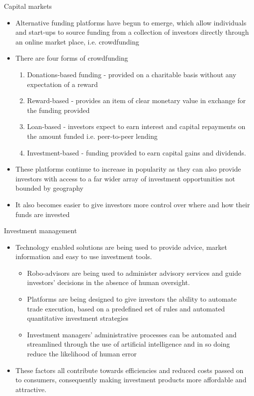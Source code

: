 \documentclass[9pt]{beamer}
\begin{document}
\begin{frame}{Capital markets}
	\begin{itemize}
		\item  Alternative funding platforms have begun to emerge, which allow individuals and start-ups to source funding from a collection of investors directly through an online market place, i.e. crowdfunding
		\item There are four forms of crowdfunding
		\begin{small}
			\begin{enumerate}
				\item Donations-based funding - provided on a charitable basis without any expectation of a reward
				\item Reward-based - provides an item of clear monetary value in exchange for the funding provided
				\item Loan-based - investors expect to earn interest and capital repayments on the amount funded i.e. peer-to-peer lending
				\item Investment-based - funding provided to earn capital gains and dividends.
			\end{enumerate}
		\end{small}
		\item These platforms continue to increase in popularity as they can also provide investors with access to a far wider array of investment opportunities not bounded by geography
		\item It also becomes easier to give investors more control over where and how their funds are invested
	\end{itemize}
\end{frame}


\begin{frame}{Investment management}
	\begin{itemize}
		\item Technology enabled solutions are being used to provide advice, market information and easy to use investment tools.
		\begin{itemize}
			\item Robo-advisors are being used to administer advisory services and guide investors' decisions in the absence of human oversight.
			\item Platforms are being designed to give investors the ability to automate trade execution, based on a predefined set of rules and automated quantitative investment strategies
			\item Investment managers' administrative processes can be automated and streamlined through the use of artificial intelligence and in so doing reduce the likelihood of human error
		\end{itemize}
		\item These factors all contribute towards efficiencies and reduced costs passed on to consumers, consequently making investment products more affordable and attractive.
	\end{itemize}
\end{frame}
\end{document}
